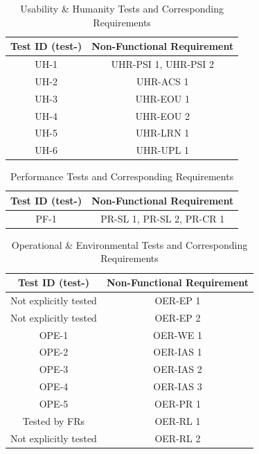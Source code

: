 \documentclass[12pt, titlepage]{article}
\begin{document}
  \begin{table}[H]
  \centering
  \caption{Usability \& Humanity Tests and Corresponding Requirements}
  \label{tab:nfr-trace-uh}
  \begin{tabular}{cc}
    \toprule \textbf{Test ID (test-)} & \textbf{Non-Functional Requirement} \\
    \midrule
    UH-1 & UHR-PSI 1, UHR-PSI 2 \\
    UH-2 & UHR-ACS 1 \\
    UH-3 & UHR-EOU 1 \\
    UH-4 & UHR-EOU 2 \\
    UH-5 & UHR-LRN 1 \\
    UH-6 & UHR-UPL 1 \\
    \bottomrule
  \end{tabular}
\end{table}


\begin{table}[H]
  \centering
  \caption{Performance Tests and Corresponding Requirements}
  \begin{tabular}{cc}
    \toprule \textbf{Test ID (test-)} & \textbf{Non-Functional Requirement} \\
    \midrule
    PF-1 & PR-SL 1, PR-SL 2, PR-CR 1 \\
    \bottomrule
  \end{tabular}
\end{table}


  \begin{table}[H]
    \centering
    \caption{Operational \& Environmental Tests and Corresponding Requirements}
    \begin{tabular}{cc}
      \toprule \textbf{Test ID (test-)} & \textbf{Non-Functional Requirement} \\
      \midrule
      Not explicitly tested & OER-EP 1 \\
      Not explicitly tested & OER-EP 2 \\
      OPE-1 & OER-WE 1 \\
      OPE-2 & OER-IAS 1 \\
      OPE-3 & OER-IAS 2 \\
      OPE-4 & OER-IAS 3 \\
      OPE-5 & OER-PR 1 \\
      Tested by FRs & OER-RL 1 \\
      Not explicitly tested & OER-RL 2 \\
      \bottomrule
    \end{tabular}
  \end{table}
\end{document}
